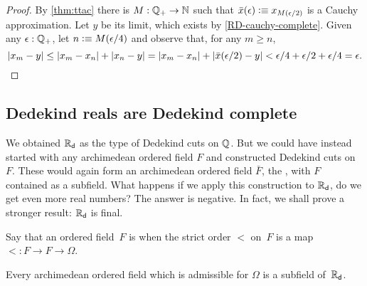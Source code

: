 \begin{proof}
  By \autoref{thm:ttac} there is $M : \mathbb{Q}_{+} \to \mathbb{N}$ such that $\bar{x}(\epsilon) \vcentcolon\equiv
  x_{M(\epsilon/2)}$ is a Cauchy approximation. Let $y$ be its limit, which exists by
  \autoref{RD-cauchy-complete}. Given any $\epsilon : \mathbb{Q}_{+}$, let $n \vcentcolon\equiv M(\epsilon/4)$
  and observe that, for any $m \geq n$,
  \begin{equation*}
    |x_m - y| \leq |x_m - x_n| + |x_n - y| =
    |x_m - x_n| + |\bar{x}(\epsilon/2) - y| <
    \epsilon/4 + \epsilon/2 + \epsilon/4 = \epsilon.\qedhere
  \end{equation*}
\end{proof}

\subsection{Dedekind reals are Dedekind complete}
\label{sec:RD-dedekind-complete}

We obtained $\mathbb{R}_\mathsf{d}$ as the type of Dedekind cuts on $\mathbb{Q}$. But we could have instead started
with any archimedean ordered field $F$ and constructed Dedekind cuts on $F$. These would
again form an archimedean ordered field $\bar{F}$, the , with $F$ contained as a subfield. What happens if we apply this construction to
$\mathbb{R}_\mathsf{d}$, do we get even more real numbers? The answer is negative. In fact, we shall prove a
stronger result: $\mathbb{R}_\mathsf{d}$ is final.

Say that an ordered field~$F$ is  when the strict order
$<$ on~$F$ is a map ${<} : F \to F \to \Omega$.

\begin{thm} \label{RD-final-field}
  Every archimedean ordered field which is admissible for $\Omega$ is a subfield of~$\mathbb{R}_\mathsf{d}$.
\end{thm}

